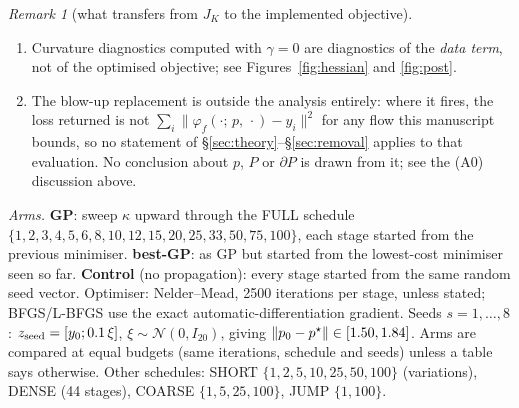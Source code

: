 \documentclass[11pt]{article}
\theoremstyle{remark}\newtheorem{remark}{Remark}
\newcommand{\pstar}{p^\star}
\newcommand{\norm}[1]{\lVert #1\rVert}
\newcommand{\flow}[3]{\varphi_f(#1;\,#2,\,#3)}
\newcommand{\readthis}[1]{\textbf{Read this:} #1}
\begin{document}
\begin{remark}[what transfers from $J_K$ to the implemented objective]
\begin{enumerate}[nosep,label=(\roman*)]
\readthis{(C1)--(C2) are \emph{assumptions}, not facts about the FHN runs, and \eqref{eq:penbias} is therefore conditional --- and, when applied to a reported number, conditional also on (R) of Remark~\ref{rem:reconnect}. ``$F$ is strongly convex near its own minimiser'' is \emph{not} enough: the penalised minimiser may lie outside that neighbourhood, which is the same circularity flagged for Theorem~\ref{thm:main}. Note also that the smoothing sharpness $\alpha=500$ does not appear in \eqref{eq:penbias} at all. This shrinkage bias must be added to any statement about $\norm{\pstar-\cdot}$; it is the shrinkage visible in Figure~\ref{fig:coef}.}
\item Curvature diagnostics computed with $\gamma=0$ are diagnostics of the \emph{data term}, not of the optimised objective; see Figures~\ref{fig:hessian} and \ref{fig:post}.
\item The blow-up replacement is outside the analysis entirely: where it fires, the loss returned is not $\sum_i\norm{\flow{\cdot}{p}{\cdot}-y_i}^2$ for any flow this manuscript bounds, so no statement of \S\ref{sec:theory}--\S\ref{sec:removal} applies to that evaluation. No conclusion about $p$, $P$ or $\partial P$ is drawn from it; see the (A0) discussion above.
\end{enumerate}
\end{remark}

\emph{Arms.} \textbf{GP}: sweep $\kappa$ upward through the FULL schedule $\{1,2,3,4,5,6,8,10,12,\allowbreak15,20,25,33,50,75,100\}$, each stage started from the previous minimiser. \textbf{best-GP}: as GP but started from the lowest-cost minimiser seen so far. \textbf{Control} (no propagation): every stage started from the same random seed vector. Optimiser: Nelder--Mead, 2500 iterations per stage, unless stated; BFGS/L-BFGS use the exact automatic-differentiation gradient. Seeds $s=1,\dots,8$: $z_{\rm seed}=[y_0;0.1\,\xi]$, $\xi\sim\mathcal N(0,I_{20})$, giving $\norm{p_0-\pstar}\in[\nseedErrLo,\nseedErrHi]$. Arms are compared at equal budgets (same iterations, schedule and seeds) unless a table says otherwise. Other schedules: SHORT $\{1,2,5,10,25,50,100\}$ (variations), DENSE (44 stages), COARSE $\{1,5,25,100\}$, JUMP $\{1,100\}$.
\end{document}
